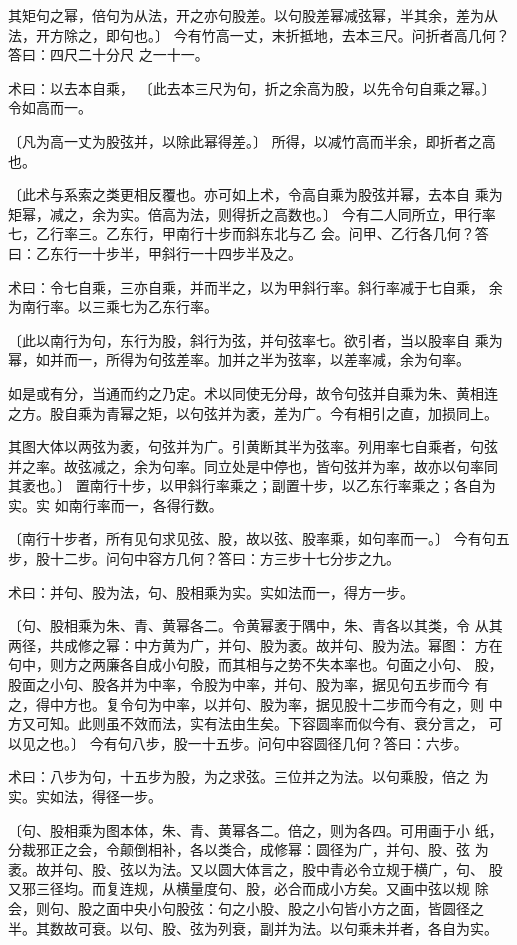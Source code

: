 \documentclass[12pt,UTF8]{ctexbook}
\begin{document}
其矩句之幂，倍句为从法，开之亦句股差。以句股差幂减弦幂，半其余，差为从 法，开方除之，即句也。〕 今有竹高一丈，末折抵地，去本三尺。问折者高几何？答曰：四尺二十分尺 之一十一。

术曰：以去本自乘， 〔此去本三尺为句，折之余高为股，以先令句自乘之幂。〕 令如高而一。

〔凡为高一丈为股弦并，以除此幂得差。〕 所得，以减竹高而半余，即折者之高也。

〔此术与系索之类更相反覆也。亦可如上术，令高自乘为股弦并幂，去本自 乘为矩幂，减之，余为实。倍高为法，则得折之高数也。〕 今有二人同所立，甲行率七，乙行率三。乙东行，甲南行十步而斜东北与乙 会。问甲、乙行各几何？答曰：乙东行一十步半，甲斜行一十四步半及之。

术曰：令七自乘，三亦自乘，并而半之，以为甲斜行率。斜行率减于七自乘， 余为南行率。以三乘七为乙东行率。

〔此以南行为句，东行为股，斜行为弦，并句弦率七。欲引者，当以股率自 乘为幂，如并而一，所得为句弦差率。加并之半为弦率，以差率减，余为句率。

如是或有分，当通而约之乃定。术以同使无分母，故令句弦并自乘为朱、黄相连 之方。股自乘为青幂之矩，以句弦并为袤，差为广。今有相引之直，加损同上。

其图大体以两弦为袤，句弦并为广。引黄断其半为弦率。列用率七自乘者，句弦 并之率。故弦减之，余为句率。同立处是中停也，皆句弦并为率，故亦以句率同 其袤也。〕 置南行十步，以甲斜行率乘之；副置十步，以乙东行率乘之；各自为实。实 如南行率而一，各得行数。

〔南行十步者，所有见句求见弦、股，故以弦、股率乘，如句率而一。〕 今有句五步，股十二步。问句中容方几何？答曰：方三步十七分步之九。

术曰：并句、股为法，句、股相乘为实。实如法而一，得方一步。

〔句、股相乘为朱、青、黄幂各二。令黄幂袤于隅中，朱、青各以其类，令 从其两径，共成修之幂：中方黄为广，并句、股为袤。故并句、股为法。幂图： 方在句中，则方之两廉各自成小句股，而其相与之势不失本率也。句面之小句、 股，股面之小句、股各并为中率，令股为中率，并句、股为率，据见句五步而今 有之，得中方也。复令句为中率，以并句、股为率，据见股十二步而今有之，则 中方又可知。此则虽不效而法，实有法由生矣。下容圆率而似今有、衰分言之， 可以见之也。〕 今有句八步，股一十五步。问句中容圆径几何？答曰：六步。

术曰：八步为句，十五步为股，为之求弦。三位并之为法。以句乘股，倍之 为实。实如法，得径一步。

〔句、股相乘为图本体，朱、青、黄幂各二。倍之，则为各四。可用画于小 纸，分裁邪正之会，令颠倒相补，各以类合，成修幂：圆径为广，并句、股、弦 为袤。故并句、股、弦以为法。又以圆大体言之，股中青必令立规于横广，句、 股又邪三径均。而复连规，从横量度句、股，必合而成小方矣。又画中弦以规 除会，则句、股之面中央小句股弦：句之小股、股之小句皆小方之面，皆圆径之 半。其数故可衰。以句、股、弦为列衰，副并为法。以句乘未并者，各自为实。
\end{document}
